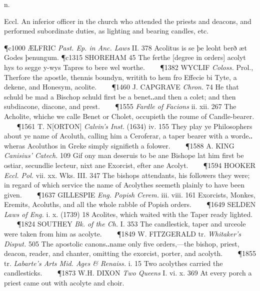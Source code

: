 \begin{description}[wide, labelwidth=!, labelindent=0pt]
  n.

\noindent {}

\vspace{-0.3cm}

\begin{myenumerate}
 Eccl. An inferior officer in the church who attended the priests and deacons, and performed subordinate duties, as lighting and bearing candles, etc. 

\P c1000 ÆLFRIC \textit{Past. Ep. in Anc. Laws} II. 378 Acolitus is se þe leoht berð æt Godes þenungum.
\P c1315 SHOREHAM 45 The ferthe [degree in orders] acolyt hys to segge y-wys Tapres to bere wel worthe.    
\P 1382 WYCLIF \textit{Coloss.} Prol., Therfore the apostle, thennis boundyn, writith to hem fro Effecie bi Tyte, a dekene, and Honesym, acolite.    
\P 1460 J. CAPGRAVE \textit{Chron.} 74 He that schuld be mad a Bischop schuld first be a benet‥and then a colet; and then subdiacone, diacone, and prest.    
\P 1555 \textit{Fardle of Facions} ii. xii. 267 The Acholite, whiche we calle Benet or Cholet, occupieth the roume of Candle-bearer.    
\P 1561 T. N[ORTON] \textit{Calvin's Inst.} (1634) iv. 155 They play ye Philosophers about ye name of Acoluth, calling him a Ceroferar, a taper bearer with a worde‥wheras Acoluthos in Greke simply signifieth a folower.    
\P 1588 A. KING \textit{Canisius' Catech.} 109 Gif ony man deseruis to be ane Bishope lat him first be ostiar, secundlie lecteur, nixt ane Exorcist, efter ane Acolyt.    
\P 1594 HOOKER \textit{Eccl. Pol.} vii. xx. Wks. III. 347 The bishops attendants, his followers they were; in regard of which service the name of Acolythes seemeth plainly to have been given.    
\P 1637 GILLESPIE \textit{Eng. Popish Cerem.} iii. viii. 161 Exorcists, Monkes, Eremits, Acoluths, and all the whole rabble of Popish orders.    
\P 1649 SELDEN \textit{Laws of Eng.} i. x. (1739) 18 Acolites, which waited with the Taper ready lighted.    
\P 1824 SOUTHEY \textit{Bk. of the Ch.} I. 353 The candlestick, taper and urceole were taken from him as acolyte.    
\P 1849 W. FITZGERALD tr. \textit{Whitaker's Disput.} 505 The apostolic canons‥name only five orders,—the bishop, priest, deacon, reader, and chanter, omitting the exorcist, porter, and acolyth.    
\P 1855 tr. \textit{Labarte's Arts Mid. Ages \& Renaiss.} i. 15 Two acolythes carried the candlesticks.    
\P 1873 W.H. DIXON \textit{Two Queens} I. vi. x. 369 At every porch a priest came out with acolyte and choir.


\end{myenumerate}
\end{description}

